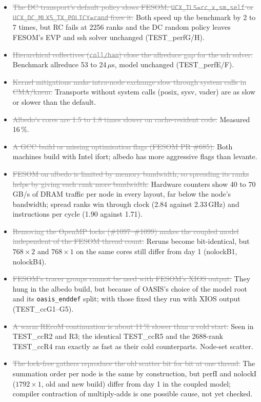 \documentclass[11pt,a4paper]{article}
\newcommand{\dead}[1]{\textcolor{gray}{\sout{#1}}}
\begin{document}
\begin{itemize}
\item \dead{The DC transport's default policy slows FESOM; \texttt{UCX\_TLS=rc\_x,sm,self} or \texttt{UCX\_DC\_MLX5\_TX\_POLICY=rand} fixes it.} Both speed up the benchmark by 2 to 7 times, but RC fails at 2256 ranks and the DC random policy leaves FESOM's EVP and ssh solver unchanged (TEST\_perfG/H).
\item \dead{Hierarchical collectives (\texttt{coll/han}) close the allreduce gap for the ssh solver.} Benchmark allreduce 53 to 24\,$\mu$s, model unchanged (TEST\_perfE/F).
\item \dead{Kernel mitigations make intra-node exchange slow through system calls in CMA/knem.} Transports without system calls (posix, sysv, vader) are as slow or slower than the default.
\item \dead{Albedo's cores are 1.5 to 1.8 times slower on cache-resident code.} Measured 16\,\%.
\item \dead{A GCC build or missing optimisation flags (FESOM PR \#685).} Both machines build with Intel ifort; albedo has more aggressive flags than levante.
\item \dead{FESOM on albedo is limited by memory bandwidth, so spreading its ranks helps by giving each rank more bandwidth.} Hardware counters show 40 to 70\,GB/s of DRAM traffic per node in every layout, far below the node's bandwidth; spread ranks win through clock (2.84 against 2.33\,GHz) and instructions per cycle (1.90 against 1.71).
\item \dead{Removing the OpenMP locks (\#1097--\#1099) makes the coupled model independent of the FESOM thread count.} Reruns become bit-identical, but $768\times2$ and $768\times1$ on the same cores still differ from day 1 (nolockB1, nolockB4).
\item \dead{FESOM's tracer groups cannot be used with FESOM's XIOS output.} They hung in the albedo build, but because of OASIS's choice of the model root and its \texttt{oasis\_enddef} split; with those fixed they run with XIOS output (TEST\_ccG1--G5).
\item \dead{A warm REcoM continuation is about 11\,\% slower than a cold start.} Seen in TEST\_ccR2 and R3; the identical TEST\_ccR5 and the 2688-rank TEST\_ccR4 ran exactly as fast as their cold counterparts. Node-set scatter.
\item \dead{The lock-free gathers reproduce the old scatter bit for bit at one thread.} The summation order per node is the same by construction, but perfI and nolockI ($1792\times1$, old and new build) differ from day 1 in the coupled model; compiler contraction of multiply-adds is one possible cause, not yet checked.
\end{itemize}
\end{document}
